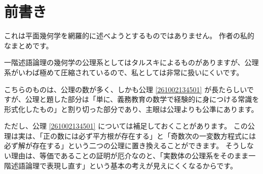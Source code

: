 \chapter*{前書き}


これは平面幾何学を網羅的に述べようとするものではありません。
作者の私的なまとめです。

一階述語論理の幾何学の公理系としてはタルスキによるものがありますが、公理系がいわば極めて圧縮されているので、私としては非常に扱いにくいです。

こちらのものは、公理の数が多く、しかも公理 \ref{261002134501} が長たらしいですが、公理と題した部分は「単に、義務教育の数学で経験的に身につける常識を形式化したもの」と割り切った部分であり、主眼は公理よりも公準にあります。

ただし、公理 \ref{261002134501} については補足しておくことがあります。
この公理は実は、「正の数には必ず平方根が存在する」と「奇数次の一変数方程式には必ず解が存在する」という二つの公理に置き換えることができます。
そうしない理由は、等価であることの証明が厄介なのと、「実数体の公理系をそのまま一階述語論理で表現し直す」という基本の考えが見えにくくなるからです。
